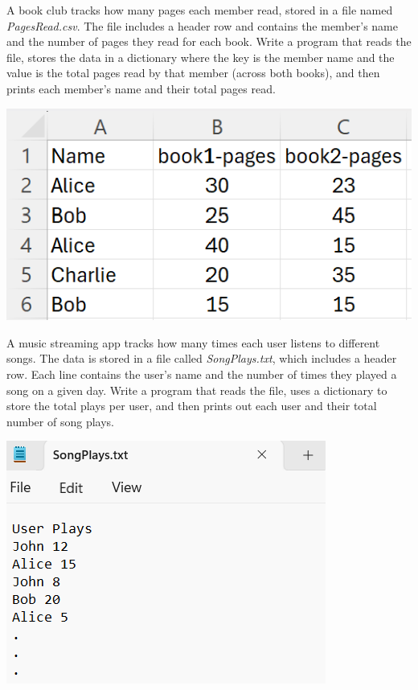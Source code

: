 	\item 
		A book club tracks how many pages each member read, stored in a file named 
		\textit{PagesRead.csv}. The file includes a header row and contains the member's 
		name and the number of pages they read for each book.  
		Write a program that reads the file, stores the data in a dictionary where the key is 
		the member name and the value is the total pages read by that member (across both books), 
		and then prints each member's name and their total pages read.
		
		\begin{flushright}
			\includegraphics[scale=.65]{imgs/PagesReadData.PNG}
		\end{flushright}


	\item 
		A music streaming app tracks how many times each user listens to different songs.  
		The data is stored in a file called \textit{SongPlays.txt}, which includes a header row.  
		Each line contains the user’s name and the number of times they played a song on a given day.  
		Write a program that reads the file, uses a dictionary to store the total plays per user, 
		and then prints out each user and their total number of song plays.
		
		\begin{flushright}
			\includegraphics[scale=.65]{imgs/SongPlaysData.PNG}
		\end{flushright}


